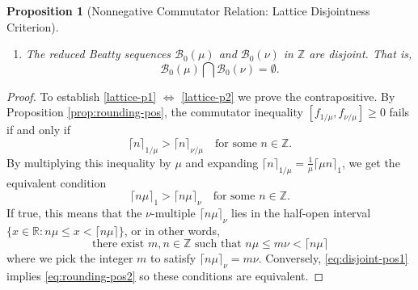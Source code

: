 \documentclass[11pt, letterpaper, reqno]{amsart}
\newtheorem{prop}[thm]{Proposition}
\theoremstyle{definition}
\numberwithin{equation}{section}
\newcommand{\RR}{\ensuremath{\mathbb{R}}}
\newcommand{\ZZ}{\ensuremath{\mathbb{Z}}}
\newcommand{\sB}{\mathcal{B}}
\newcommand{\ceil}[1]{\lceil{#1}\rceil}
\newcommand{\um}{{\mu}}
\newcommand{\vm}{{\nu}}
\begin{document}
{\begin{prop}[Nonnegative Commutator Relation: Lattice Disjointness Criterion]
\begin{enumerate}
\item[(P3)] 
\label{lattice-p3}
The reduced Beatty sequences $\sB_0(\um)$ and $\sB_0(\vm)$ in $\ZZ$ are disjoint. 
That is,
\begin{equation}
\sB_0(\um) \bigcap \sB_0(\vm) = \emptyset.
\end{equation}
\end{enumerate}
\end{prop}



\begin{proof} 
To establish \eqref{lattice-p1} $\Leftrightarrow$ \eqref{lattice-p2}  we prove the contrapositive.
By Proposition \ref{prop:rounding-pos}, the commutator inequality $[f_{1/\um}, f_{\vm/\um}] \geq 0$ 
fails if and only if 
\begin{equation*}
\ceil{n}_{1/\um} > \ceil{n}_{\vm/\um} \quad\text{for some }n\in\ZZ.
\end{equation*}
By multiplying this inequality by $\um$ and expanding $\ceil{n}_{1/\um} = \frac{1}{\um}\ceil{\um  n}_1$, 
we get the equivalent condition
\begin{equation}\label{eq:rounding-pos2}
\ceil{n \um}_{1} > \ceil{n \um}_{\vm} \quad\text{for some }n\in\ZZ.
\end{equation}
If true, this means that the $\vm$-multiple $\ceil{n \um}_{\vm}$ lies in the half-open interval 
$\{x \in \RR : n \um \leq x < \ceil{n\um}\}$,
or in other words, 
\begin{equation}\label{eq:disjoint-pos1}
\text{there exist } m, n \in \ZZ \text{ such that }  n \um \leq m \vm < \ceil{n \um}
\end{equation}
where we pick the integer $m$ to satisfy $\ceil{n \um}_{\vm} = m \vm$.
Conversely, \eqref{eq:disjoint-pos1} implies \eqref{eq:rounding-pos2} so these conditions are equivalent.


\end{proof}}
\end{document}
